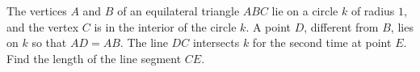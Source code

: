 The vertices $ A$ and $ B$ of an equilateral triangle $ ABC$ lie on a circle $k$ of radius $1$, and the vertex $ C$ is in the interior of the circle $ k$. A point $ D$, different from $ B$, lies on $ k$ so that $ AD=AB$. The line $ DC$ intersects $ k$ for the second time at point $ E$. Find the length of the line segment $ CE$.